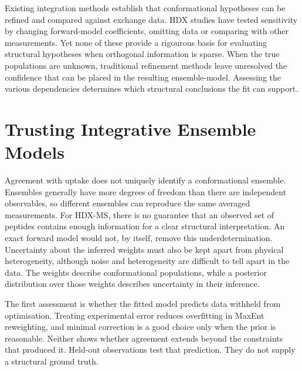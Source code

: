 Existing integration methods establish that conformational hypotheses can be refined and compared against exchange data. HDX studies have tested sensitivity by changing forward-model coefficients, omitting data or comparing with other measurements.\supercite{jiaIntegratingHydrogenDeuterium2023,bradshawInterpretationHDXData2020} Yet none of these provide a rigourous basis for evaluating structural hypotheses when orthogonal information is sparse. When the true populations are unknown, traditional refinement methods leave unresolved the confidence that can be placed in the resulting ensemble-model. Assessing the various dependencies determines which structural conclusions the fit can support.

\section{Trusting Integrative Ensemble Models}
\label{sec:intro-trust}

Agreement with uptake does not uniquely identify a conformational ensemble. Ensembles generally have more degrees of freedom than there are independent observables, so different ensembles can reproduce the same averaged measurements.\supercite{berlinRecoveringRepresentativeConformational2013,bonomiPrinciplesProteinStructural2017} For HDX-MS, there is no guarantee that an observed set of peptides contains enough information for a clear structural interpretation.\supercite{bradshawInterpretationHDXData2020} An exact forward model would not, by itself, remove this underdetermination. Uncertainty about the inferred weights must also be kept apart from physical heterogeneity, although noise and heterogeneity are difficult to tell apart in the data.\supercite{bonomiPrinciplesProteinStructural2017} The weights describe conformational populations, while a posterior distribution over those weights describes uncertainty in their inference.\supercite{bmsb2012ch12}

The first assessment is whether the fitted model predicts data withheld from optimisation. Treating experimental error reduces overfitting in MaxEnt reweighting, and minimal correction is a good choice only when the prior is reasonable.\supercite{cesariUsingMaximumEntropy2018} Neither shows whether agreement extends beyond the constraints that produced it. Held-out observations test that prediction. They do not supply a structural ground truth.

